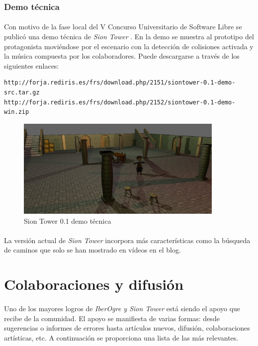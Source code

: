 \documentclass[16pt,spanish]{article}
\def \proyecto{\emph {IberOgre y Sion Tower} }
\def \juego{\emph {Sion Tower} }
\begin{document}
\subsubsection{Demo técnica}

\paragraph{}
Con motivo de la fase local del V Concurso Universitario de Software Libre
se publicó una demo técnica de \juego. En la demo se muestra al prototipo
del protagonista moviéndose por el escenario con la detección de colisiones
activada y la música compuesta por los colaboradores. Puede descargarse
a través de los siguientes enlaces:

\begin{verbatim}
http://forja.rediris.es/frs/download.php/2151/siontower-0.1-demo-src.tar.gz
http://forja.rediris.es/frs/download.php/2152/siontower-0.1-demo-win.zip
\end{verbatim}

\begin{figure}[H]
    \centering
        \includegraphics[width=10cm]{img/demo-tecnica.jpg} 
    \caption{Sion Tower 0.1 demo técnica}
    \label{img:demo}
\end{figure}

\paragraph{}
La versión actual de \juego incorpora más características como la búsqueda
de caminos que solo se han mostrado en vídeos en el blog. 

\section{Colaboraciones y difusión}

\paragraph{}
Uno de los mayores logros de \proyecto está siendo el apoyo que recibe de
la comunidad. El apoyo se manifiesta de varias formas: desde sugerencias
o informes de errores hasta artículos nuevos, difusión, colaboraciones
artísticas, etc. A continuación se proporciona una lista de las más relevantes.
\end{document}
